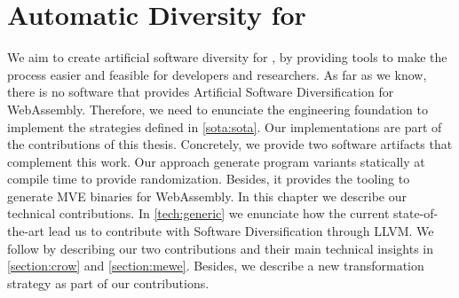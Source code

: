\chapter{Automatic Diversity for \wasm}
\label{chapter:technical}


We aim to create artificial software diversity for \wasm, by providing tools to make the process easier and feasible for developers and researchers. As far as we know, there is no software that provides Artificial Software Diversification for WebAssembly. Therefore, we need to enunciate the engineering foundation to implement the strategies defined in \autoref{sota:sota}. Our implementations are part of the contributions of this thesis. Concretely, we provide two software artifacts that complement this work. Our approach generate \wasm program variants statically at compile time to provide randomization. Besides, it provides the tooling to generate MVE binaries for WebAssembly.
In this chapter we describe our technical contributions. In \autoref{tech:generic} we enunciate how the current state-of-the-art lead us to contribute with Software Diversification through LLVM. We follow by describing our two contributions and their main technical insights in \autoref{section:crow} and \autoref{section:mewe}. Besides, we describe a new transformation strategy as part of our contributions. 


















